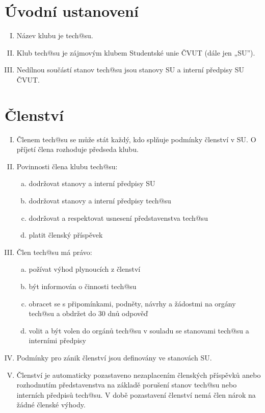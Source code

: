 \documentclass[10pt]{article}
\begin{document}
\section{Úvodní ustanovení} %
	\begin{enumerate}[I.]
	\item Název klubu je tech@su.
	\item Klub tech@su je zájmovým klubem Studentské unie ČVUT (dále jen „SU”).  
	\item Nedílnou součástí stanov tech@su jsou stanovy SU a interní předpisy SU ČVUT.
	\end{enumerate}

\section{Členství} %
	\begin{enumerate}[I.]
	\item Členem tech@su se může stát každý, kdo splňuje podmínky členství v SU. O příjetí člena rozhoduje předseda klubu.
	\item Povinnosti člena klubu tech@su: 
		\begin{enumerate}[a.]
		\item dodržovat stanovy a interní předpisy SU
		\item dodržovat stanovy a interní předpisy tech@su
		\item dodržovat a respektovat usnesení představenstva tech@su
		\item platit členský příspěvek
		\end{enumerate}
	\item Člen tech@su má právo:
		\begin{enumerate}[a.]
		\item požívat výhod plynoucích z členství
		\item být informován o činnosti tech@su 
		\item obracet se s připomínkami, podněty, návrhy a žádostmi na orgány tech@su a obdržet do 30 dnů odpověď
		\item volit a být volen do orgánů tech@su v souladu se stanovami tech@su a interními předpisy
		\end{enumerate}
	\item Podmínky pro zánik členství jsou definovány ve stanovách SU.  
	\item Členství je automaticky pozastaveno nezaplacením členských příspěvků anebo rozhodnutím představenstva na základě porušení stanov tech@su nebo interních předpisů tech@su. V době pozastavení členství nemá člen nárok na žádné členské výhody.     
	\end{enumerate}
\end{document}
